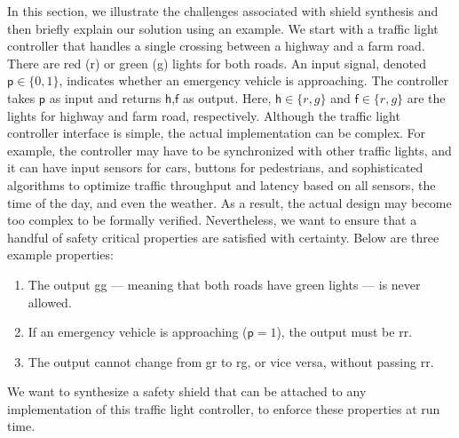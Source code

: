 \documentclass{llncs}
\begin{document}
In this section, we illustrate the challenges associated with shield 
synthesis and then briefly explain our solution using an example.  
We start with a traffic light controller that handles a single crossing 
between a highway and a farm road.  There are red (\textsf{r}) or green 
(\textsf{g}) lights for both roads.  An input signal, denoted 
$\textsf{p}\in\{0,1\}$, indicates whether an emergency vehicle is 
approaching.  The controller takes $\textsf{p}$ as input and returns 
$\textsf{h,f}$ as output.  Here, $\textsf{h}\in\{r,g\}$ and 
$\textsf{f}\in\{r,g\}$ are the lights for highway and farm road, 
respectively.
Although the traffic light controller interface is simple, the actual 
implementation can be complex.  For example, the controller may have to 
be synchronized with other traffic lights, and it can have input sensors 
for cars, buttons for pedestrians, and sophisticated algorithms to 
optimize traffic throughput and latency based on all sensors, the time 
of the day, and even the weather.  As a result, the actual design may 
become too complex to be formally verified.  Nevertheless, we want to 
ensure that a handful of safety critical properties are satisfied with 
certainty.  Below are three example properties:
\begin{enumerate}
\item The output \textsf{gg} --- meaning that both roads have green
  lights --- is never allowed.
\item If an emergency vehicle is approaching ($\textsf{p}=1$), the
  output must be \textsf{rr}.
\item The output cannot change from \textsf{gr} to \textsf{rg}, or
  vice versa, without passing \textsf{rr}.
\end{enumerate}
We want to synthesize a safety shield that can be attached to any 
implementation of this traffic light controller, to enforce these 
properties at run time.
\end{document}
